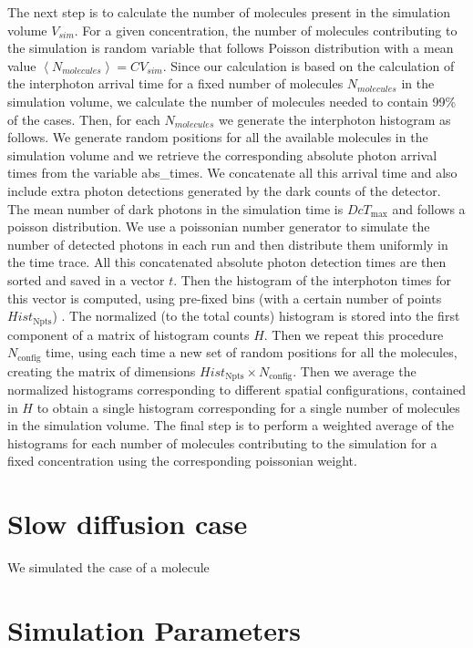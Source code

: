 The next step is to calculate the number of molecules present in the simulation volume  $V_{sim}$. For a given concentration, the number of molecules contributing to the simulation is random variable that follows Poisson distribution with a mean value $\left<N_{molecules}\right> = C V_{sim}$. Since our calculation is based on the calculation of the interphoton arrival time for a fixed number of molecules $N_{molecules}$ in the simulation volume, we calculate the number of molecules needed to contain 99\% of the cases. Then, for each $N_{molecules}$ we generate the interphoton histogram as follows. We generate random positions for all the available molecules in the simulation volume and we retrieve the corresponding absolute photon arrival times from the variable abs\_times. We concatenate all this arrival time and also include extra photon detections generated by the dark counts of the detector. The mean number of dark photons in the simulation time is $Dc T_{\mbox{max}}$ and follows a poisson distribution. We use a poissonian number generator to simulate the number of detected photons in each run and then distribute them uniformly in the time trace. All this concatenated absolute photon detection times are then sorted and saved in a vector $t$. Then the histogram of the interphoton times for this vector is computed, using pre-fixed bins (with a certain number of points $Hist_{\mbox{Npts}}$) . The normalized (to the total counts) histogram is stored into the first component of a matrix of histogram counts $H$. Then we repeat this procedure $N_{\mbox{config}}$ time, using each time a new set of random positions for all the molecules, creating the matrix of dimensions $Hist_{\mbox{Npts}} \times N_{\mbox{config}}$. Then we average the normalized histograms corresponding to different spatial configurations, contained in $H$ to obtain a single histogram corresponding for a single number of molecules in the simulation volume. The final step is to perform a weighted average of the histograms for each number of molecules contributing to the simulation for a fixed concentration using the corresponding poissonian weight.



\section{Slow diffusion case}

We simulated the case of a molecule 


\section{Simulation Parameters\label{ap:sim_param}}

